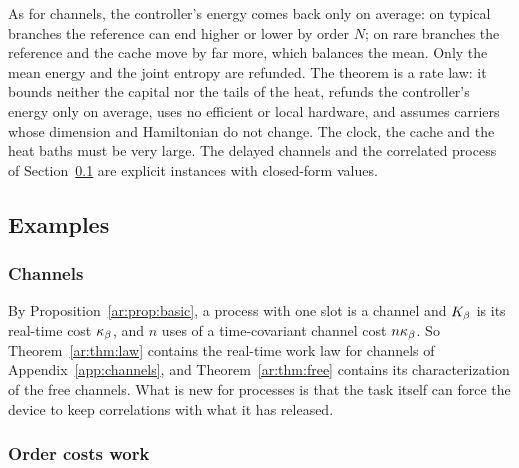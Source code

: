 As for channels, the controller's energy comes back only on average: on typical branches the reference can end higher or lower by order $N$; on rare branches the reference and the cache move by far more, which balances the mean. Only the mean energy and the joint entropy are refunded. The theorem is a rate law: it bounds neither the capital nor the tails of the heat, refunds the controller's energy only on average, uses no efficient or local hardware, and assumes carriers whose dimension and Hamiltonian do not change. The clock, the cache and the heat baths must be very large. The delayed channels and the correlated process of Section~\ref{ar:sec:examples} are explicit instances with closed-form values.

\subsection{Examples}\label{ar:sec:examples}

\subsubsection{Channels}

By Proposition~\ref{ar:prop:basic}, a process with one slot is a channel and $K_\beta$ is its real-time cost $\kappa_\beta$, and $n$ uses of a time-covariant channel cost $n\kappa_\beta$. So Theorem~\ref{ar:thm:law} contains the real-time work law for channels of Appendix~\ref{app:channels}, and Theorem~\ref{ar:thm:free} contains its characterization of the free channels. What is new for processes is that the task itself can force the device to keep correlations with what it has released.

\subsubsection{Order costs work}

